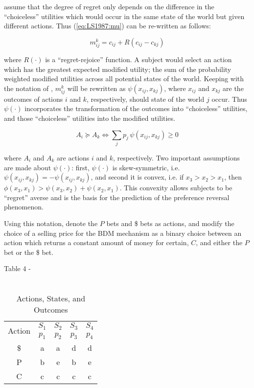 \documentclass[../main.tex]{subfiles}
\begin{document}
\textcite[809]{Loomes1987} assume that the degree of regret only depends on the difference in the \enquote{choiceless} utilities which would occur in the same state of the world but given different actions.
Thus (\ref{eq:LS1987:mu}) can be re-written as follows:

\begin{equation}
	\label{eq:LS1987:mu2}
	m^k_{ij} = c_{ij} + R(c_{ij} - c_{kj})
\end{equation}

\noindent where $R(\cdot)$ is a \enquote{regret-rejoice} function. 
A subject would select an action which has the greatest expected modified utility; the sum of the probability weighted modified utilities across all potential states of the world.
Keeping with the notation of \textcite{Loomes1989}, $m^k_{ij}$ will be rewritten as $\psi(x_{ij}, x_{kj})$, where $x_{ij}$ and $x_{kj}$ are the outcomes of actions $i$ and $k$, respectively, should state of the world $j$ occur.
Thus $\psi(\cdot)$ incorporates the transformation of the outcomes into \enquote{choiceless} utilities, and those \enquote{choiceless} utilities into the modified utilities.

\begin{equation}
	\label{eq:LSS1989:mu3}
	A_i \succcurlyeq  A_k \Leftrightarrow \sum_{j} p_j \, \psi ( x_{ij} , x_{kj} ) \geq  0
\end{equation}

\noindent where $A_i$ and $A_k$ are actions $i$ and $k$, respectively.
Two important assumptions are made about $\psi(\cdot)$: first, $\psi(\cdot)$ is skew-symmetric, i.e. $\psi(x_{ij},x_{kj}) = -\psi(x_{ij},x_{kj})$, and second it is convex, i.e. if $x_3 > x_2 > x_1$, then $\phi(x_3,x_1) > \psi(x_3,x_2) + \psi(x_2,x_1)$.
This convexity allows subjects to be \enquote{regret} averse and is the basis for the prediction of the preference reversal phenomenon.

Using this notation, \textcite{Loomes1989} denote the $P$ bets and {\$} bets as actions, and modify the choice of a selling price for the BDM mechanism as a binary choice between an action which returns a constant amount of money for certain, $C$, and either the $P$ bet or the {\$} bet.

Table 4 -  \textcite{Loomes1989}
\begin{table}[ht]
	\centering
	\caption{ \textcite[149]{Loomes1989} \\ Actions, States, and Outcomes }
	\label{tb:LSS1989:ASO}
	\begin{tabular}{ccccc}
		\multirow{2}{*}{Action} & $S_1$ & $S_2$ & $S_3$ & $S_4$ \\[-.75em]
		                        & $p_1$ & $p_2$ & $p_3$ & $p_4$ \\\hline
		                    {\$}  &   a   &   a   &   d   &   d   \\
		                    P   &   b   &   e   &   b   &   e   \\
		                    C   &   c   &   c   &   c   &   c   
	\end{tabular}
\end{table}
\end{document}
